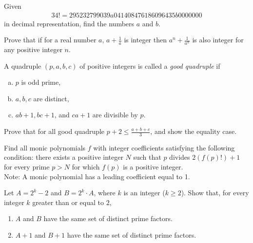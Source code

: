 \documentclass[problems.tex]{subfile}
\begin{document}
	\begin{problem}
		Given
		\begin{align*}
			34!=295232799039a041408476186096435b0000000
		\end{align*}
		in decimal representation, find the numbers $a$ and $b$. %
	\end{problem}

	\begin{problem}
		Prove that if for a real number $a $, $a+\frac {1}{a} $ is integer then $a^n+\frac {1}{a^n} $ is also integer for any positive integer $n$. %
	\end{problem}

	\begin{problem}
		A quadruple $(p,a,b,c)$ of positive integers is called a \textit{good quadruple} if
		\begin{enumerate}[(a)]
			\item $p $ is odd prime,
			\item $a,b,c $ are distinct,
			\item $ab+1,bc+1$, and $ca+1$ are divisible by $p$.
		\end{enumerate}
		Prove that for all good quadruple $p+2\le \frac {a+b+c}{3} $, and show the equality case. %
	\end{problem}

	\begin{problem}[Balkan 2016]
		Find all monic polynomials $f$ with integer coefficients satisfying the following condition: there exists a positive integer $N$ such that $p$ divides $2(f(p)!)+1$ for every prime $p>N$ for which $f(p)$ is a positive integer.
		\\
		Note: A monic polynomial has a leading coefficient equal to 1. %
	\end{problem}

	\begin{problem}
		Let $A=2^k - 2$ and $B= 2^k \cdot A$, where $k$ is an integer ($k \ge 2$).
		Show that, for every integer $k$ greater than or equal to $2$,
		\begin{enumerate}
			\item $A$ and $B$ have the same set of distinct prime factors.
			\item $A+1$ and $B+1$ have the same set of distinct prime factors.
		\end{enumerate}
	\end{problem}
\end{document}
